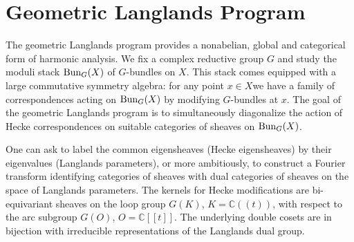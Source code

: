 \documentclass[12pt]{article}
\begin{document}
\section{Geometric Langlands Program}
The geometric Langlands program provides a nonabelian, global and categorical form of harmonic analysis. We fix a complex reductive group $G$ and study the moduli stack $\operatorname{Bun}_G(X)$ of $G$-bundles on $X$. This stack comes equipped with a large commutative symmetry algebra: for any point $x\in X $we have a family of correspondences acting on $\operatorname{Bun}_G(X)$ by modifying $G$-bundles at $x$. The goal of the geometric Langlands program is to simultaneously diagonalize the action of Hecke correspondences on suitable categories of sheaves on $\operatorname{Bun}_G(X)$. 

One can ask to label the common eigensheaves (Hecke eigensheaves) by their eigenvalues (Langlands
parameters), or more ambitiously, to construct a Fourier transform identifying categories of sheaves
with dual categories of sheaves on the space of Langlands parameters.
The kernels for Hecke modifications are bi-equivariant sheaves on the loop group \( G(K) \), \( K = \mathbb{C}((t)) \), with respect to the arc subgroup \( G(O) \), \( O = \mathbb{C}[[t]] \). The underlying double cosets are in bijection with irreducible representations of the Langlands dual group.

{}

\end{document}
